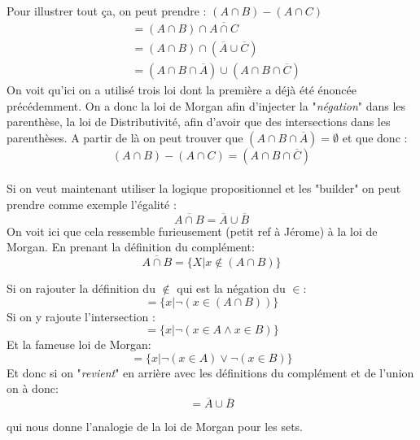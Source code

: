 \begin{exemple}
Pour illustrer tout ça, on peut prendre : $(A \cap B) - (A \cap C)$
\begin{align*}
    &= (A \cap B) \cap \overline{A \cap C} \\
    &= (A\cap B) \cap ( \overline{A}\cup \overline{C})\\
    &= (A \cap B \cap \overline{A}) \cup (A\cap B \cap \overline{C})
\end{align*}
On voit qu'ici on a utilisé trois loi dont la première a déjà été énoncée précédemment. On a donc la loi de Morgan afin d'injecter la "\textit{négation}" dans les parenthèse, la loi de Distributivité, afin d'avoir que des intersections dans les parenthèses. A partir de là on peut trouver que $(A \cap B \cap \overline{A}) = \emptyset$ et que donc : 
\begin{equation*}
    (A\cap B ) - ( A \cap C ) = (A \cap B \cap \overline{C})
\end{equation*}
\hspace{0.4cm}
\\
Si on veut maintenant utiliser la logique propositionnel et les "builder" on peut prendre comme exemple l'égalité : 
\begin{equation*}
    \overline{A \cap B} = \overline{A}\cup \overline{B}
\end{equation*}
On voit ici que cela ressemble furieusement (petit ref à Jérome) à la loi de Morgan. En prenant la définition du complément: 
\begin{equation*}
    \overline{A \cap B} = \{X|x \notin (A \cap B)\}
\end{equation*}

Si on rajouter la définition du $\notin$ qui est la négation du $\in$:
\begin{equation*}
    = \{x | \neg(x \in (A \cap B))\}
\end{equation*}
Si on y rajoute l'intersection : 
\begin{equation*}
    = \{x | \neg(x \in A \wedge x \in B)\}
\end{equation*}
Et la fameuse loi de Morgan: 
\begin{equation*}
    =\{ x | \neg(x \in A) \vee \neg(x \in B)\}
\end{equation*}
Et donc si on "\textit{revient}" en arrière avec les définitions du complément et de l'union on à donc:
\begin{equation*}
    = \overline{A} \cup \overline{B}
\end{equation*}
\end{exemple}
qui nous donne l'analogie de la loi de Morgan pour les sets.
\\

